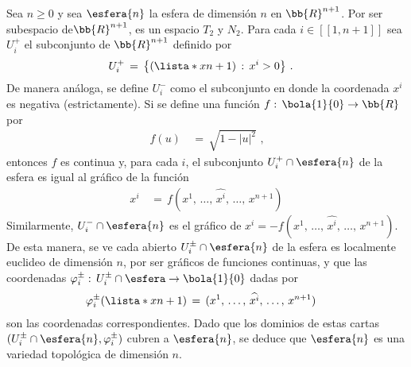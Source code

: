 



\begin{ejemplo}
	Sea $n\geq 0$ y sea $\esfera{n}$ la esfera de dimensi\'{o}n $n$ en
	$\bb{R}^{n+1}$. Por ser subespacio de$\bb{R}^{n+1}$, es un espacio
	$T_{2}$ y $N_{2}$. Para cada $i\in[\![1,n+1]\!]$ sea $U_{i}^{+}$ el
	subconjunto de $\bb{R}^{n+1}$ definido por
	\begin{align*}
		U_{i}^{+} & \,=\,\big\lbrace (\lista*{x}{n+1})\,:\,x^{i}>0
			\big\rbrace
		\text{ .}
	\end{align*}
	De manera an\'{a}loga, se define $U_{i}^{-}$ como el subconjunto en
	donde la coordenada $x^{i}$ es negativa (estrictamente). Si se
	define una funci\'{o}n $f:\,\bola{1}{0}\rightarrow\bb{R}$ por
	\begin{align*}
		f(u) & \,=\,\sqrt{1-|u|^{2}}\text{ ,}
	\end{align*}
	entonces $f$ es continua y, para cada $i$, el subconjunto
	$U_{i}^{+}\cap\esfera{n}$ de la esfera es igual al gr\'{a}fico de
	la funci\'{o}n
	\begin{align*}
		x^{i} & \,=\,f(x^{1},\,\dots,\,\widehat{x^{i}},\,\dots,\,
			x^{n+1})
	\end{align*}
	Similarmente, $U_{i}^{-}\cap\esfera{n}$ es el gr\'{a}fico de
	$x^{i}=-f(x^{1},\,\dots,\,\widehat{x^{i}},\,\dots,\,x^{n+1})$. De
	esta manera, se ve cada abierto $U_{i}^{\pm}\cap\esfera{n}$ de la
	esfera es localmente euclideo de dimensi\'{o}n $n$, por ser
	gr\'{a}ficos de funciones continuas, y que las coordenadas
	$\varphi_{i}^{\pm}:\,U_{i}^{\pm}\cap\esfera\rightarrow\bola{1}{0}$
	dadas por
	\begin{align*}
		\varphi_{i}^{\pm}(\lista*{x}{n+1}) & \,=\,
			(x^{1},\,\dots,\,\widehat{x^{i}},\,\dots,\,x^{n+1})
	\end{align*}
	son las coordenadas correspondientes. Dado que los dominios de estas
	cartas $(U_{i}^{\pm}\cap\esfera{n},\varphi_{i}^{\pm})$ cubren a
	$\esfera{n}$, se deduce que $\esfera{n}$ es una variedad
	topol\'{o}gica de dimensi\'{o}n $n$.


\end{ejemplo}
